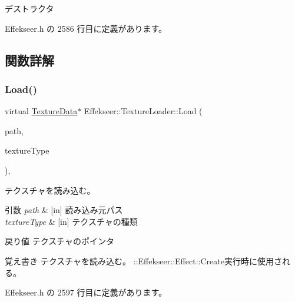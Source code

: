 デストラクタ 



 Effekseer.\+h の 2586 行目に定義があります。



\subsection{関数詳解}
\mbox{\label{class_effekseer_1_1_texture_loader_a91cc55233a4131d9994857dfe611460b}} 
\subsubsection{\texorpdfstring{Load()}{Load()}}
{\footnotesize\ttfamily virtual \mbox{\hyperlink{struct_effekseer_1_1_texture_data}{Texture\+Data}}$\ast$ Effekseer\+::\+Texture\+Loader\+::\+Load (\begin{DoxyParamCaption}\item[{const \mbox{\hyperlink{_effekseer_8h_a50b026abea014b47854bcd835b3b6233}{E\+F\+K\+\_\+\+C\+H\+AR}} $\ast$}]{path,  }\item[{\mbox{\hyperlink{namespace_effekseer_a781925ba462884c4ef87fd38ffdedba4}{Texture\+Type}}}]{texture\+Type }\end{DoxyParamCaption})\hspace{0.3cm}{\ttfamily [inline]}, {\ttfamily [virtual]}}



テクスチャを読み込む。 


\begin{DoxyParams}{引数}
{\em path} & \mbox{[}in\mbox{]} 読み込み元パス \\
\hline
{\em texture\+Type} & \mbox{[}in\mbox{]} テクスチャの種類 \\
\hline
\end{DoxyParams}
\begin{DoxyReturn}{戻り値}
テクスチャのポインタ 
\end{DoxyReturn}
\begin{DoxyNote}{覚え書き}
テクスチャを読み込む。 \+::\+Effekseer\+::\+Effect\+::\+Create実行時に使用される。 
\end{DoxyNote}


 Effekseer.\+h の 2597 行目に定義があります。

\mbox{\label{class_effekseer_1_1_texture_loader_a128fdd6e613758012fb9ceaf2881adb7}} 
